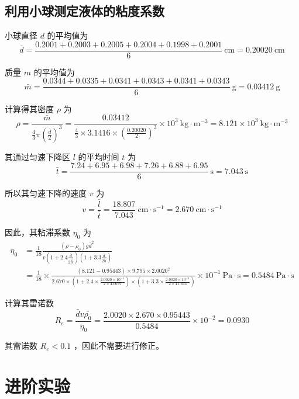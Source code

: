 \documentclass[10pt,a4paper]{article}	%
\begin{document}




	\subsection{利用小球测定液体的粘度系数}
	
	小球直径 $d$ 的平均值为
	$$
	\bar{d}=\frac{0.2001+0.2003+0.2005+0.2004+0.1998+0.2001}{6} \mathrm{~cm}=0.20020 \mathrm{~cm}
	$$

	质量 $m$ 的平均值为
	$$
	\bar{m}=\frac{0.0344+0.0335+0.0341+0.0343+0.0341+0.0343}{6} \mathrm{~g}=0.03412 \mathrm{~g}
	$$

	计算得其密度 $\rho$ 为
	$$
	\rho=\frac{\bar{m}}{\frac{4}{3} \pi\left(\frac{\bar{d}}{2}\right)^3}=\frac{0.03412}{\frac{4}{3} \times 3.1416 \times\left(\frac{0.20020}{2}\right)^3} \times 10^3 \mathrm{~kg} \cdot \mathrm{m}^{-3}=8.121 \times 10^3 \mathrm{~kg} \cdot \mathrm{m}^{-3}
	$$

	其通过匀速下降区 $l$ 的平均时间 $t$ 为
	$$
	\bar{t}=\frac{7.24+6.95+6.98+7.26+6.88+6.95}{6} \mathrm{~s}=7.043 \mathrm{~s}
	$$

	所以其匀速下降的速度 $v$ 为
	$$
	v=\frac{\bar{l}}{\bar{t}}=\frac{18.807}{7.043} \mathrm{~cm} \cdot \mathrm{s}^{-1}=2.670 \mathrm{~cm} \cdot \mathrm{s}^{-1}
	$$

	因此，其粘滞系数 $\eta_0$ 为
	$$
	\begin{aligned}
	\eta_0&=\frac{1}{18} \frac{\left(\rho-\overline{\rho_0}\right) g \bar{d}^2}{v\left(1+2.4 \frac{\bar{d}}{2 \overline{\bar{R}}}\right)\left(1+3.3 \frac{\bar{d}}{2 \bar{h}}\right)}\\
	&=\frac{1}{18} \times \frac{(8.121-0.95443) \times 9.795 \times 2.0020^2}{2.670 \times\left(1+2.4 \times \frac{2.0020 \times 10^{-1}}{2 \times 4.0697}\right) \times\left(1+3.3 \times \frac{2.0020 \times 10^{-1}}{2 \times 41.343}\right)} \times 10^{-1} \mathrm{~P a} \cdot \mathrm{s}=0.5484 \mathrm{~P a} \cdot \mathrm{s}	
	\end{aligned}
	$$

	计算其雷诺数
	$$
	R_{e}=\frac{\bar{d} v \overline{\rho_0}}{\eta_0}=\frac{2.0020 \times 2.670 \times 0.95443}{0.5484} \times 10^{-2}=0.0930
	$$

	其雷诺数 $R_{e} < 0.1$ ，因此不需要进行修正。
	\section{进阶实验}
\end{document}
